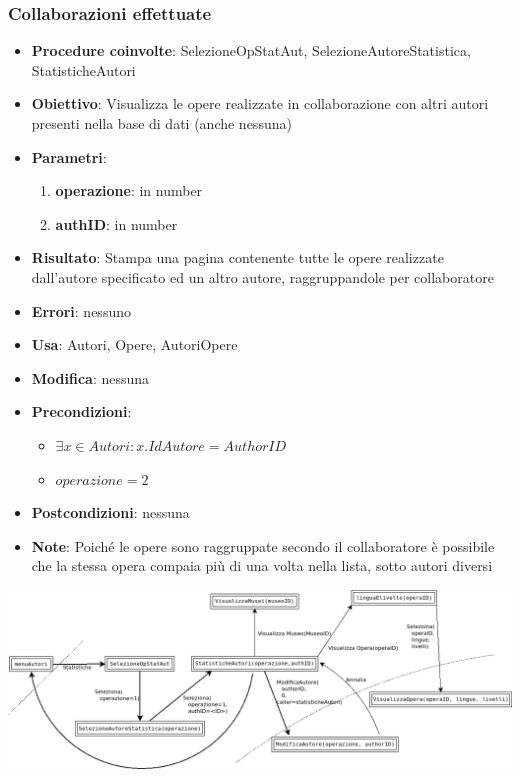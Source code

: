 \subsubsection{Collaborazioni effettuate}
\label{Collaborazioni}
\begin{itemize}
	\item \textbf{Procedure coinvolte}: SelezioneOpStatAut, SelezioneAutoreStatistica, StatisticheAutori
	\item \textbf{Obiettivo}: Visualizza le opere realizzate in collaborazione con altri autori presenti nella base di dati (anche nessuna)
	\item \textbf{Parametri}:
	\begin{enumerate}
		\item \textbf{operazione}: in number
		\item \textbf{authID}: in number
	\end{enumerate}
	\item \textbf{Risultato}: Stampa una pagina contenente tutte le opere realizzate dall'autore specificato ed un altro autore, raggruppandole per collaboratore
	\item \textbf{Errori}: nessuno
	\item \textbf{Usa}: Autori, Opere, AutoriOpere
	\item \textbf{Modifica}: nessuna
	\item \textbf{Precondizioni}:
	\begin{itemize}
		\item $\exists x \in Autori : x.IdAutore = AuthorID$
		\item $operazione  = 2$
	\end{itemize}
	\item \textbf{Postcondizioni}: nessuna
	\item \textbf{Note}: Poiché le opere sono raggruppate secondo il collaboratore
	è possibile che la stessa opera compaia più di una volta nella lista, sotto autori
	diversi
\end{itemize}
\includegraphics[width=\textwidth]{img/statAutori-1.png}\\[1cm]

